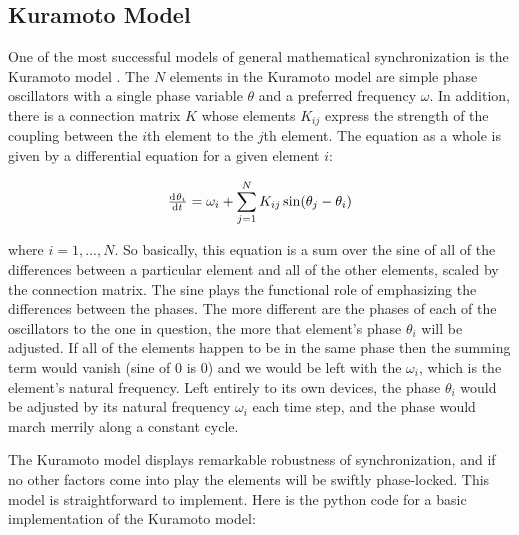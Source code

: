 \documentclass[12pt]{article}
\begin{document}
\subsection{Kuramoto Model}

One of the most successful models of general mathematical synchronization is the Kuramoto model \cite{Acebrón} \cite{Ermentrout}.  The $N$ elements in the Kuramoto model are simple phase oscillators with a single phase variable $\theta$ and a preferred frequency $\omega$.  In addition, there is a connection matrix $K$ whose elements $K_{ij}$ express the strength of the coupling between the $i$th element to the $j$th element.  The equation as a whole is given by a differential equation for a given element $i$:

$$ \od{\theta_i}{t}=\omega_i+\sum\limits_{j=1}^N K_{ij}\sin(\theta_j-\theta_i)$$

where $i=1,...,N$.  So basically, this equation is a sum over the sine of all of the differences between a particular element and all of the other elements, scaled by the connection matrix.  The sine plays the functional role of emphasizing the differences between the phases.  The more different are the phases of each of the oscillators to the one in question, the more that element's phase $\theta_i$ will be adjusted.  If all of the elements happen to be in the same phase then the summing term would vanish (sine of 0 is 0) and we would be left with the $\omega_i$, which is the element's natural frequency.  Left entirely to its own devices, the phase $\theta_i$ would be adjusted by its natural frequency $\omega_i$ each time step, and the phase would march merrily along a constant cycle.  

The Kuramoto model displays remarkable robustness of synchronization, and if no other factors come into play the elements will be swiftly phase-locked.  This model is straightforward to implement.  Here is the python code for a basic implementation of the Kuramoto model:
\end{document}
